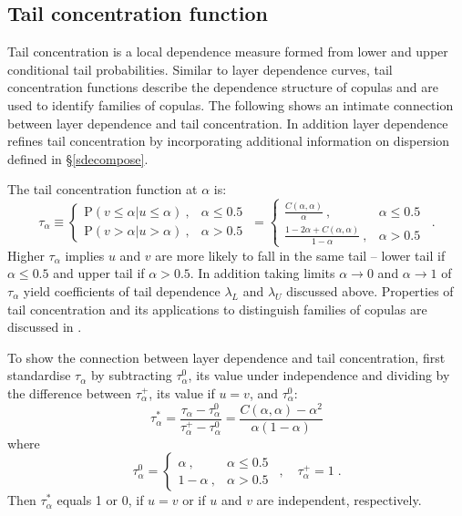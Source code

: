 \documentclass[authoryear]{elsarticle}
\newcommand{\p}{\mathrm{P}}
\newcommand{\cq}{\ ,\quad }
\newcommand{\sref}[1]{\S\ref{#1}}
\begin{document}
\subsection{Tail concentration function}


Tail concentration \citep{venter2002tails} is a local dependence measure formed from lower and upper conditional tail probabilities. Similar to layer dependence curves, tail concentration functions describe the dependence structure of copulas and are used to identify families of copulas. The following shows an intimate connection between layer dependence and tail concentration. In addition layer dependence refines tail concentration by incorporating additional information on dispersion defined in \sref{sdecompose}.

The tail concentration function at $\alpha$ is:
$$
\tau_\alpha  \equiv \left\{\begin{array}{cc}\p(v\leq \alpha|u\leq \alpha)\ ,  & \alpha\leq 0.5\ \\
\p(v>\alpha|u>\alpha)\ ,& \alpha>0.5 \ \end{array}\right.
=\left\{\begin{array}{cc}\frac{C(\alpha,\alpha)}{\alpha}\ , & \alpha\leq 0.5\ \\
\frac{1-2\alpha+C(\alpha,\alpha)}{1-\alpha}\ ,& \alpha>0.5 \ \end{array}\right. \;.
$$
Higher $\tau_\alpha$ implies $u$ and $v$ are more likely to fall in the same tail -- lower tail if $\alpha\leq 0.5$ and upper tail if $\alpha>0.5$. In addition taking limits $\alpha\rightarrow 0$ and $\alpha\rightarrow 1$ of $\tau_\alpha$ yield coefficients of tail dependence $\lambda_L$ and $\lambda_U$ discussed above. Properties of tail concentration and its applications to distinguish families of copulas are  discussed in \cite{durante2014copulas}.


To show the connection between layer dependence and tail concentration, first standardise $\tau_\alpha$ by subtracting $\tau_\alpha^0$, its value under independence and dividing by the difference between $\tau_\alpha^+$, its value if $u=v$, and $\tau_\alpha^0$:
$$
\tau_\alpha^*=\frac{\tau_\alpha-\tau_\alpha^0}{\tau_\alpha^+-\tau_\alpha^0} = \frac{C(\alpha,\alpha)-\alpha^2}{\alpha(1-\alpha)}
$$
where
$$
\tau_\alpha^0=\left\{\begin{array}{cc}\alpha \ , & \alpha\leq 0.5\ \\
1-\alpha \ ,& \alpha>0.5 \ \end{array}\right.
\cq
\tau_\alpha^+=1 \;.
$$
Then $\tau_\alpha^*$ equals 1 or 0, if $u=v$ or  if $u$ and $v$ are independent, respectively.
\end{document}
